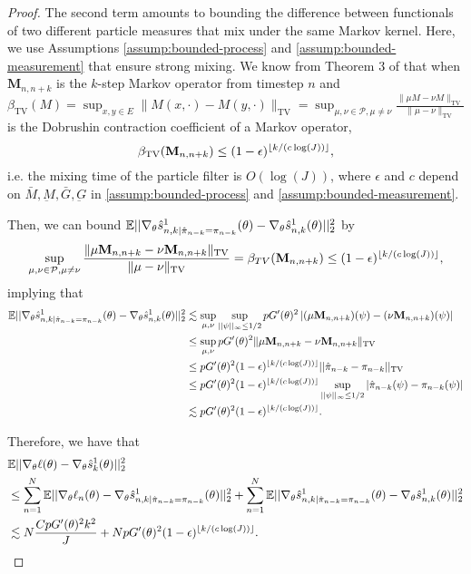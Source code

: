 \begin{proof}
The second term amounts to bounding the difference between functionals of two different particle measures that mix under the same Markov kernel. Here, we use Assumptions \ref{assump:bounded-process} and \ref{assump:bounded-measurement} that ensure strong mixing. We know from Theorem 3 of \cite{karjalainen23} that when $\textbf{M}_{n,n+k}$ is the $k$-step Markov operator from timestep $n$ and $\beta_{\text{TV}}(M) = \sup _{x, y \in E}\|M(x, \cdot)-M(y, \cdot)\|_{\mathrm{TV}}=\sup _{\mu, \nu \in \mathcal{P}, \mu \neq \nu} \frac{\|\mu M-\nu M\|_{\mathrm{TV}}}{\|\mu-\nu\|_{\mathrm{TV}}}$ is the Dobrushin contraction coefficient of a Markov operator, 
$$\beta_{\text{TV}}(\textbf{M}_{n,n+k}) \leq (1-\epsilon)^{\lfloor k/(c\log(J)) \rfloor},$$
i.e. the mixing time of the particle filter is $O(\log(J))$, where $\epsilon$ and $c$ depend on $\bar{M}, \underbar{M}, \bar{G}, \underbar{G}$ in \ref{assump:bounded-process} and \ref{assump:bounded-measurement}. 

Then, we can bound 
$\mathbb{E}||\nabla_\theta\hat s_{n,k|\hat\pi_{n-k}=\pi_{n-k}}^1(\theta) - \nabla_\theta\hat s_{n,k}^1(\theta)||_2^2$ by
$$\sup _{\mu, \nu \in \mathcal{P}, \mu \neq \nu} \frac{\|\mu \textbf{M}_{n,n+k}-\nu \textbf{M}_{n,n+k}\|_{\mathrm{TV}}}{\|\mu-\nu\|_{\mathrm{TV}}} = \beta_{TV}(\textbf{M}_{n,n+k}) \leq (1-\epsilon)^{\lfloor k/(c\log(J)) \rfloor},$$
implying that
\begin{align}
    \mathbb{E}||\nabla_\theta\hat s_{n,k|\hat\pi_{n-k}=\pi_{n-k}}^1(\theta) - \nabla_\theta\hat s_{n,k}^1(\theta)||_2^2 
    &\lesssim \sup_{\mu, \nu} \sup_{||\psi||_\infty \leq 1/2} pG'(\theta)^2\left|(\mu \textbf{M}_{n,n+k})(\psi)-(\nu \textbf{M}_{n,n+k})(\psi)\right| \\
    &\leq \sup_{\mu, \nu} pG'(\theta)^2\|\mu \textbf{M}_{n,n+k}-\nu \textbf{M}_{n,n+k}\|_{\mathrm{TV}} \\
    &\leq pG'(\theta)^2(1-\epsilon)^{\lfloor k/(c\log(J)) \rfloor} ||\hat\pi_{n-k} - \pi_{n-k}||_{\text{TV}} \\
    &\leq pG'(\theta)^2(1-\epsilon)^{\lfloor k/(c\log(J)) \rfloor} \sup_{||\psi||_{\infty} \leq 1/2} |\hat\pi_{n-k}(\psi) - \pi_{n-k}(\psi)| \\
    &\lesssim pG'(\theta)^2(1-\epsilon)^{\lfloor k/(c\log(J)) \rfloor}.
\end{align}

Therefore, we have that
\begin{align}
    &\mathbb{E}||\nabla_\theta\ell(\theta) - \nabla_\theta\hat s_k^1(\theta)||_2^2 \\
    &\leq \sum_{n=1}^N \mathbb{E}||\nabla_\theta\ell_n(\theta) - \nabla_\theta\hat s_{n,k|\hat\pi_{n-k}=\pi_{n-k}}^1(\theta)||_2^2 + \sum_{n=1}^N \mathbb{E}||\nabla_\theta\hat s_{n,k|\hat\pi_{n-k}=\pi_{n-k}}^1(\theta) - \nabla_\theta\hat s_{n,k}^1(\theta)||_2^2\\
    &\lesssim N\frac{CpG'(\theta)^2k^2}{J} + NpG'(\theta)^2(1-\epsilon)^{\lfloor k/(c\log(J)) \rfloor}.
\end{align}





\end{proof}
